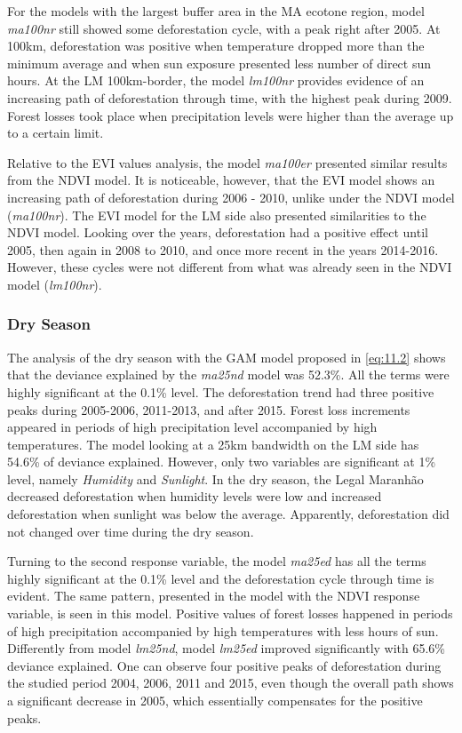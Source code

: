 For the models with the largest buffer area in the MA ecotone region, model \textit{ma100nr} still showed some deforestation cycle, with a peak right after 2005. At 100km, deforestation was positive when temperature dropped more than the minimum average and when sun exposure presented less number of direct sun hours. At the LM 100km-border, the model \textit{lm100nr} provides evidence of an increasing path of deforestation through time, with the highest peak during 2009. Forest losses took place when precipitation levels were higher than the average up to a certain limit. 

Relative to the EVI values analysis, the model \textit{ma100er} presented similar results from the NDVI model. It is noticeable, however, that the EVI model shows an increasing path of deforestation during 2006 - 2010, unlike under the NDVI model (\textit{ma100nr}). The EVI model for the LM side also presented similarities to the NDVI model. Looking over the years, deforestation had a positive effect until 2005, then again in 2008 to 2010, and once more recent in the years 2014-2016. However, these cycles were not different from what was already seen in the NDVI model (\textit{lm100nr}).


\subsubsection{Dry Season}

The analysis of the dry season with the GAM model proposed in \ref{eq:11.2} shows that the deviance explained by the \textit{ma25nd} model was 52.3\%. All the terms were highly significant at the 0.1\% level. The deforestation trend had three positive peaks during 2005-2006, 2011-2013, and after 2015. Forest loss increments appeared in periods of high precipitation level accompanied by high temperatures. The model looking at a 25km bandwidth on the LM side has 54.6\% of deviance explained. However, only two variables are significant at 1\% level, namely \textit{Humidity} and \textit{Sunlight}. In the dry season, the Legal Maranhão decreased deforestation when humidity levels were low and increased deforestation when sunlight was below the average. Apparently, deforestation did not changed over time during the dry season. 

Turning to the second response variable, the model \textit{ma25ed} has all the terms highly significant at the 0.1\% level and the deforestation cycle through time is evident. The same pattern, presented in the model with the NDVI response variable, is seen in this model. Positive values of forest losses happened in periods of high precipitation accompanied by high temperatures with less hours of sun. Differently from model \textit{lm25nd}, model \textit{lm25ed} improved significantly with 65.6\% deviance explained. One can observe four positive peaks of deforestation during the studied period 2004, 2006, 2011 and 2015, even though the overall path shows a significant decrease in 2005, which essentially compensates for the positive peaks. 

